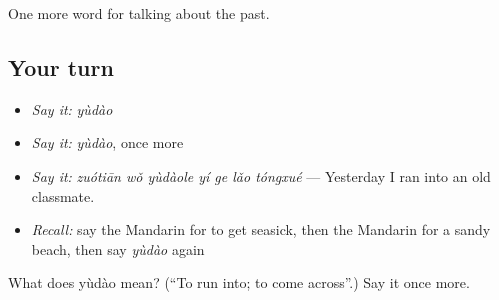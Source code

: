 \begin{grammarlens}[title={What you've built}]
One more word for talking about the past.
\end{grammarlens}

\subsection*{Your turn}
\begin{itemize}
\raggedright
  \item \emph{Say it:} \emph{yùdào}
  \item \emph{Say it:} \emph{yùdào}, once more
  \item \emph{Say it:} \emph{zuótiān wǒ yùdàole yí ge lǎo tóngxué} — Yesterday I ran into an old classmate.
  \item \emph{Recall:} say the Mandarin for to get seasick, then the Mandarin for a sandy beach, then say \emph{yùdào} again
\end{itemize}

\begin{tcolorbox}[breakable,colback=teal!4,colframe=teal!35!black,title={Before you move on}]
What does yùdào mean? (\textquotedblleft{}To run into; to come across\textquotedblright{}.) Say it once more.
\end{tcolorbox}
